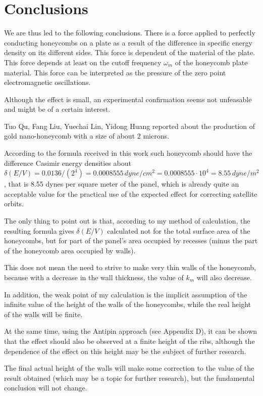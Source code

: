 \documentclass[11pt]{article}
\begin{document}
    \section{Conclusions}\label{conclusions}

    We are thus led to the following conclusions. There is a force applied
to perfectly conducting honeycombs on a plate as a result of the
difference in specific energy density on its different sides. This force
is dependent of the material of the plate. This force depends at least
on the cutoff frequency \(\omega_m\) of the honeycomb plate material.
This force can be interpreted as the pressure of the zero point
electromagnetic oscillations.

    Although the effect is small, an experimental confirmation seems not
unfeasable and might be of a certain interest.

    Tuo Qu, Fang Liu, Yuechai Lin, Yidong Huang \cite{Tuo2019} reported
about the production of gold nano-honeycomb with a size of about 2
microns.

According to the formula received in this work such honeycomb should
have the difference Casimir energy densities about
\(\delta\left(E/V\right) = 0.0136/({2^4}) = 0.0008555\,dyne/cm^2 = 0.0008555 \cdot 10^4 = 8.55\,dyne/m^2\),
that is 8.55 dynes per square meter of the panel, which is already quite
an acceptable value for the practical use of the expected effect for
correcting satellite orbits.

The only thing to point out is that, according to my method of
calculation, the resulting formula gives \(\delta\left(E/V\right)\)
calculated not for the total surface area of the honeycombs, but for
part of the panel's area occupied by recesses (minus the part of the
honeycomb area occupied by walls).

This does not mean the need to strive to make very thin walls of the
honeycomb, because with a decrease in the wall thickness, the value of
\(k_m\) will also decrease.

In addition, the weak point of my calculation is the implicit assumption
of the infinite value of the height of the walls of the honeycombs,
while the real height of the walls will be finite.

At the same time, using the Antipin approach (see Appendix D), it can be
shown that the effect should also be observed at a finite height of the
ribs, although the dependence of the effect on this height may be the
subject of further research.

The final actual height of the walls will make some correction to the
value of the result obtained (which may be a topic for further
research), but the fundamental conclusion will not change.
\end{document}
